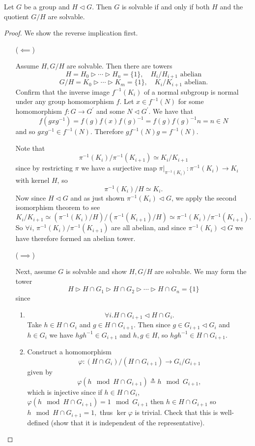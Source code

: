 \begin{prop}
Let $G$ be a group and $H \triangleleft G$. Then $G$ is solvable if
and only if both $H$ and the quotient $G / H$ are solvable.
\end{prop}
\begin{proof}

We show the reverse implication first.
\begin{itemize}
\item[($\impliedby$)]
{
Assume $H, G / H$ are solvable. Then there are towers
$$
H = H_0 \triangleright \cdots \triangleright H_n = \{ 1 \}, \quad
H_i/H_{i+1} \text{ abelian}
$$
$$
G/H = K_0 \triangleright \cdots \triangleright K_m = \{ 1 \}, \quad
K_i/K_{i+1} \text{ abelian}.
$$
Confirm that the inverse image $f^{-1}(K_i)$ of a normal subgroup is
normal under any group homomorphism $f$. Let $x \in f^{-1}(N)$ for
some homomorphism $f : G \to G^\prime$ and some $N \triangleleft
G^\prime$. We have that
$$
  f(g x g^{-1})
= f(g) f(x) f(g)^{-1}
= f(g) f(g)^{-1} n = n \in N
$$
and so $g x g^{-1} \in f^{-1}(N)$. Therefore
$g f^{-1}(N) g = f^{-1}(N)$.

Note that
$$
\pi^{-1}(K_i) / \pi^{-1}(K_{i+1}) \simeq K_i / K_{i+1}
$$
since by restricting $\pi$ we have a surjective map
$\pi|_{\pi^{-1}(K_i)} : \pi^{-1}(K_i) \to K_i$ with kernel $H$,
so
$$
\pi^{-1}(K_i) / H \simeq K_i.
$$
Now since $H \triangleleft G$ and as just shown
$\pi^{-1}(K_i) \triangleleft G$, we apply the second isomorphism
theorem to see
$$
K_i / K_{i+1} \simeq (\pi^{-1}(K_i) / H) / (\pi^{-1}(K_{i+1}) / H)
             \simeq \pi^{-1}(K_i) / \pi^{-1}(K_{i+1}).
$$
So $\forall i$, $\pi^{-1}(K_i) / \pi^{-1}(K_{i+1})$ are all abelian,
and since $\pi^{-1}(K_i) \triangleleft G$ we have therefore formed
an abelian tower.
}
\item[($\implies$)]
{
Next, assume $G$ is solvable and show $H, G/H$ are solvable.
We may form the tower
$$
H \triangleright H \cap G_1
  \triangleright H \cap G_2
  \triangleright \cdots
  \triangleright H \cap G_n = \{ 1 \}
$$
since
\begin{enumerate}
  \item{
    $$
    \forall i . H \cap G_{i+1} \triangleleft H \cap G_i.
    $$
    Take $h \in H \cap G_i$ and $g \in H \cap G_{i+1}$.
    Then since $g \in G_{i+1} \triangleleft G_i$ and
    $h \in G_i$ we have $h g h^{-1} \in G_{i+1}$ and
    $h, g \in H$, so $h g h^{-1} \in H \cap G_{i+1}$.
  }
  \item{
    Construct a homomorphism
    $$
    \varphi : (H \cap G_i) / (H \cap G_{i+1}) \to G_i / G_{i+1}
    $$
    given by
    $$
    \varphi(h \mod H \cap G_{i+1}) \triangleq h \mod G_{i+1},
    $$
    which is injective since if $h \in H \cap G_i$,
    $\varphi(h \mod H \cap G_{i+1}) = 1 \mod G_{i+1}$ then
    $h \in H \cap G_{i+1}$ so
    $h \mod H \cap G_{i+1} = 1,$
    thus $\ker \varphi$ is trivial.
    Check that this is well-defined (show that it is independent of
    the representative).

}
\end{enumerate}}
\end{itemize}
\end{proof}
